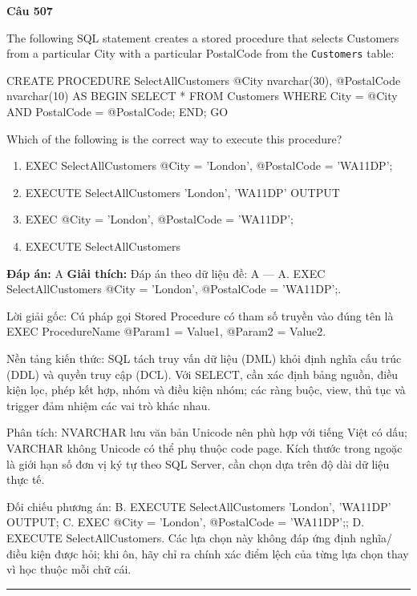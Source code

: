 \documentclass[11pt,a4paper]{article}
\newenvironment{question}[1]{%
  \par\vspace{1em}\noindent\textbf{\large Câu #1}\par\vspace{0.4em}
}{%
  \par\vspace{1em}\hrule\vspace{0.6em}
}
\newenvironment{choices}{%
  \begin{enumerate}[label=\textbf{\Alph*.},leftmargin=2.2em,itemsep=2pt,topsep=3pt]
}{%
  \end{enumerate}
}
\newcommand{\choice}{\item}
\newenvironment{codebox}{%
  \begin{tcolorbox}[colback=gray!8!white,colframe=gray!50!black,arc=1.5mm,boxrule=0.6pt,left=3mm,right=3mm,top=2.5mm,bottom=2.5mm]
  \ttfamily\small
}{%
  \end{tcolorbox}
}
\begin{document}
\begin{question}{507}
The following SQL statement creates a stored procedure that selects Customers from a particular City with a particular PostalCode from the \texttt{Customers} table:
\begin{codebox}
CREATE PROCEDURE SelectAllCustomers @City nvarchar(30), @PostalCode nvarchar(10)
AS
BEGIN
    SELECT * FROM Customers WHERE City = @City AND PostalCode = @PostalCode;
END;
GO
\end{codebox}
Which of the following is the correct way to execute this procedure?
\begin{choices}
\choice EXEC SelectAllCustomers @City = 'London', @PostalCode = 'WA11DP';
\choice EXECUTE SelectAllCustomers 'London', 'WA11DP' OUTPUT
\choice EXEC @City = 'London', @PostalCode = 'WA11DP';
\choice EXECUTE SelectAllCustomers
\end{choices}
\textbf{Đáp án:} A
\textbf{Giải thích:} Đáp án theo dữ liệu đề: A — A. EXEC SelectAllCustomers @City = 'London', @PostalCode = 'WA11DP';.

Lời giải gốc: Cú pháp gọi Stored Procedure có tham số truyền vào đúng tên là EXEC ProcedureName @Param1 = Value1, @Param2 = Value2.

Nền tảng kiến thức: SQL tách truy vấn dữ liệu (DML) khỏi định nghĩa cấu trúc (DDL) và quyền truy cập (DCL). Với SELECT, cần xác định bảng nguồn, điều kiện lọc, phép kết hợp, nhóm và điều kiện nhóm; các ràng buộc, view, thủ tục và trigger đảm nhiệm các vai trò khác nhau.

Phân tích: NVARCHAR lưu văn bản Unicode nên phù hợp với tiếng Việt có dấu; VARCHAR không Unicode có thể phụ thuộc code page. Kích thước trong ngoặc là giới hạn số đơn vị ký tự theo SQL Server, cần chọn dựa trên độ dài dữ liệu thực tế.

Đối chiếu phương án: B. EXECUTE SelectAllCustomers 'London', 'WA11DP' OUTPUT; C. EXEC @City = 'London', @PostalCode = 'WA11DP';; D. EXECUTE SelectAllCustomers. Các lựa chọn này không đáp ứng định nghĩa/điều kiện được hỏi; khi ôn, hãy chỉ ra chính xác điểm lệch của từng lựa chọn thay vì học thuộc mỗi chữ cái.
\end{question}
\end{document}
